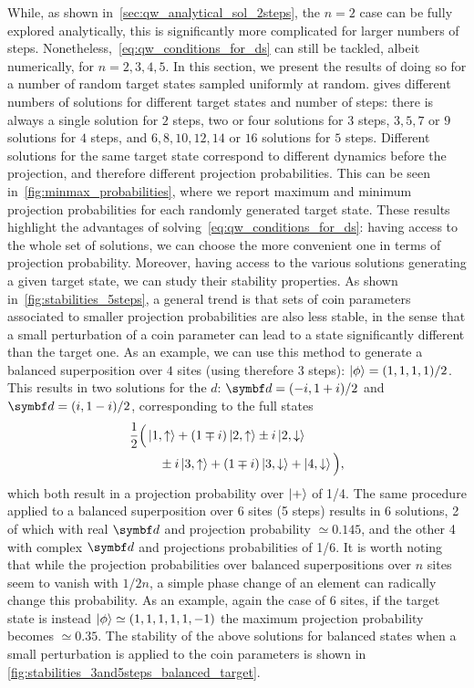 While, as shown in~\cref{sec:qw_analytical_sol_2steps}, the $n=2$ case can be fully explored analytically, this is significantly more complicated for larger numbers of steps. Nonetheless,~\cref{eq:qw_conditions_for_ds} can still be tackled, albeit numerically, for $n=2,3,4,5$.
In this section, we present the results of doing so for a number of random target states sampled uniformly at random.
 gives different numbers of solutions for different target states and number of steps:
there is always a single solution for $2$ steps, two or four solutions for $3$ steps, $3, 5, 7$ or $9$ solutions for $4$ steps, and $6, 8, 10, 12, 14$ or $16$ solutions for $5$ steps.
Different solutions for the same target state correspond to different dynamics before the projection, and therefore different projection probabilities.
This can be seen in~\cref{fig:minmax_probabilities}, where we report maximum and minimum projection probabilities for each randomly generated target state.
These results highlight the advantages of solving~\cref{eq:qw_conditions_for_ds}: having access to the whole set of solutions, we can choose the more convenient one in terms of projection probability.
Moreover, having access to the various solutions generating a given target state, we can study their stability properties.
As shown in~\cref{fig:stabilities_5steps}, a general trend is that sets of coin parameters associated to smaller projection probabilities are also less stable, in the sense that a small perturbation of a coin parameter can lead to a state significantly different than the target one.
As an example, we can use this method to generate a balanced superposition over $4$ sites (using therefore $3$ steps): $\ket\phi = (1, 1, 1, 1) / 2$.
This results in two solutions for the $d$: $\bs d = (-i, 1+i)/2$ and $\bs d = (i, 1 - i)/2$,
corresponding to the full states
\begin{equation*}
\begin{split}
	\frac{1}{2}\Big(
		&\ket{1,\uparrow} + 
		(1 \mp i) \ket{2,\uparrow} \pm i \ket{2, \downarrow} \\
		&\quad \pm i \ket{3, \uparrow} + (1 \mp i) \ket{3, \downarrow} +
		\ket{4, \downarrow}
	\Big),
\end{split}
\end{equation*}
which both result in a projection probability over $\ket+$ of 1/4.
The same procedure applied to a balanced superposition over 6 sites (5 steps) results in 6 solutions, 2 of which with real $\bs d$ and projection probability $\simeq 0.145$, and the other 4 with complex $\bs d$ and projections probabilities of 1/6.
It is worth noting that while the projection probabilities over balanced superpositions over $n$ sites seem to vanish with $1/2n$, a simple phase change of an element can radically change this probability.
As an example, again the case of 6 sites, if the target state is instead $\ket\phi \simeq (1,1,1,1,1,-1)$ the maximum projection probability becomes $\simeq 0.35$.
The stability of the above solutions for balanced states when a small perturbation is applied to the coin parameters is shown in \cref{fig:stabilities_3and5steps_balanced_target}.


